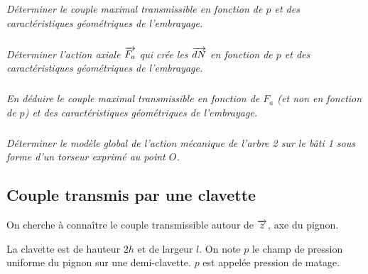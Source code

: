 \documentclass[10pt,fleqn]{article} %
\begin{document}
\begin{multicols}{2}
\subparagraph{}
\textit{Déterminer le couple maximal transmissible en fonction de $p$ et des caractéristiques 
géométriques de l’embrayage.}

\subparagraph{}
\textit{Déterminer l’action axiale $\overrightarrow{F_a}$ qui crée les $\overrightarrow{dN}$ en fonction de $p$ et des caractéristiques géométriques de l’embrayage.}

\subparagraph{}
\textit{En déduire le couple maximal transmissible en fonction de $F_a$ (et non en fonction de $p$) et des caractéristiques géométriques de l’embrayage.}


%
%
%
%
%
%
%
%
%
%
%
%

\setcounter{exo}{0}
\subparagraph{}
\textit{Déterminer le modèle global de l'action mécanique de l'arbre 2 sur le bâti 1 sous forme d'un torseur exprimé au point $O$.}

\subsection*{Couple transmis par une clavette}
\setcounter{exo}{0}

On cherche à connaître le couple transmissible autour de $\overrightarrow{z}$, axe du pignon.

La clavette est de hauteur $2h$ et de largeur $l$. On note $p$ le champ de pression uniforme du pignon sur une demi-clavette. $p$ est appelée pression de matage. 


\end{multicols}
\end{document}
